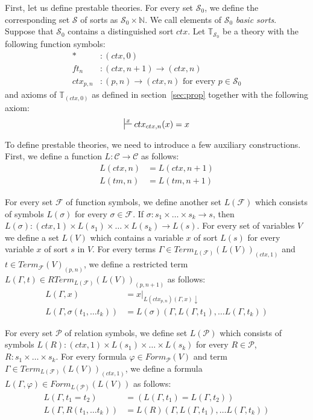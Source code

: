 \documentclass[reqno]{amsart}
\theoremstyle{definition}
\theoremstyle{remark}
\newcommand{\emptyCtx}{*}
\numberwithin{figure}{section}
\begin{document}
First, let us define prestable theories.
For every set $\mathcal{S}_0$, we define the corresponding set $\mathcal{S}$ of sorts as $\mathcal{S}_0 \times \mathbb{N}$.
We call elements of $\mathcal{S}_0$ \emph{basic sorts}.
Suppose that $\mathcal{S}_0$ contains a distinguished sort $ctx$.
Let $\mathbb{T}_{\mathcal{S}_0}$ be a theory with the following function symbols:
\begin{align*}
\emptyCtx  &: (ctx,0) \\
ft_n & : (ctx,n+1) \to (ctx,n) \\
ctx_{p,n} & : (p,n) \to (ctx,n) \text{ for every } p \in \mathcal{S}_0
\end{align*}
and axioms of $\mathbb{T}_{(ctx,0)}$ as defined in section~\ref{sec:prop} together with the following axiom:
\[ \sststile{}{x} ctx_{ctx,n}(x) = x \]

To define prestable theories, we need to introduce a few auxiliary constructions.
First, we define a function $L : \mathcal{C} \to \mathcal{C}$ as follows:
\begin{align*}
L(ctx,n) & = L(ctx,n+1) \\
L(tm,n) & = L(tm,n+1)
\end{align*}

For every set $\mathcal{F}$ of function symbols, we define another set $L(\mathcal{F})$ which consists of symbols $L(\sigma)$ for every $\sigma \in \mathcal{F}$.
If $\sigma : s_1 \times \ldots \times s_k \to s$, then $L(\sigma) : (ctx,1) \times L(s_1) \times \ldots \times L(s_k) \to L(s)$.
For every set of variables $V$ we define a set $L(V)$ which contains a variable $x$ of sort $L(s)$ for every variable $x$ of sort $s$ in $V$.
For every terms $\Gamma \in Term_{L(\mathcal{F})}(L(V))_{(ctx,1)}$ and $t \in Term_{\mathcal{F}}(V)_{(p,n)}$,
we define a restricted term $L(\Gamma,t) \in RTerm_{L(\mathcal{F})}(L(V))_{(p,n+1)}$ as follows:
\begin{align*}
L(\Gamma, x) & = x|_{L(ctx_{p,n})(\Gamma, x) \downarrow} \\
L(\Gamma, \sigma(t_1, \ldots t_k)) & = L(\sigma)(\Gamma, L(\Gamma, t_1), \ldots L(\Gamma, t_k))
\end{align*}

For every set $\mathcal{P}$ of relation symbols, we define set $L(\mathcal{P})$ which consists of symbols
    $L(R) : (ctx,1) \times L(s_1) \times \ldots \times L(s_k)$ for every $R \in \mathcal{P}$, $R : s_1 \times \ldots \times s_k$.
For every formula $\varphi \in Form_\mathcal{P}(V)$ and term $\Gamma \in Term_{L(\mathcal{F})}(L(V))_{(ctx,1)}$,
we define a formula $L(\Gamma, \varphi) \in Form_{L(\mathcal{P})}(L(V))$ as follows:
\begin{align*}
L(\Gamma, t_1 = t_2) & = (L(\Gamma, t_1) = L(\Gamma, t_2)) \\
L(\Gamma, R(t_1, \ldots t_k)) & = L(R)(\Gamma, L(\Gamma, t_1), \ldots L(\Gamma, t_k))
\end{align*}
\end{document}
